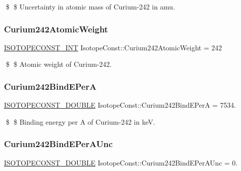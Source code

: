 \$ \$ Uncertainty in atomic mass of Curium-\/242 in amu. \mbox{\label{group___isotope_const-_curium-_cm242_gaaea41d7ce7da9f09d6c66ef2e4c37550}} 
\subsubsection{\texorpdfstring{Curium242\+Atomic\+Weight}{Curium242AtomicWeight}}
{\footnotesize\ttfamily \mbox{\hyperlink{group___isotope_const-_macros_ga5f18360b3e99483a35c32d789e62621c}{I\+S\+O\+T\+O\+P\+E\+C\+O\+N\+S\+T\+\_\+\+I\+NT}} Isotope\+Const\+::\+Curium242\+Atomic\+Weight = 242}

\$ \$ Atomic weight of Curium-\/242. \mbox{\label{group___isotope_const-_curium-_cm242_gaabe348310f75f6a88f179a2be4bc4879}} 
\subsubsection{\texorpdfstring{Curium242\+Bind\+E\+PerA}{Curium242BindEPerA}}
{\footnotesize\ttfamily \mbox{\hyperlink{group___isotope_const-_macros_ga8f45a7272ce02c0b4c65c44636ed719a}{I\+S\+O\+T\+O\+P\+E\+C\+O\+N\+S\+T\+\_\+\+D\+O\+U\+B\+LE}} Isotope\+Const\+::\+Curium242\+Bind\+E\+PerA = 7534.}

\$ \$ Binding energy per A of Curium-\/242 in keV. \mbox{\label{group___isotope_const-_curium-_cm242_gadaebc4b3d4e3f3cbd4e71d6b2f3c2c37}} 
\subsubsection{\texorpdfstring{Curium242\+Bind\+E\+Per\+A\+Unc}{Curium242BindEPerAUnc}}
{\footnotesize\ttfamily \mbox{\hyperlink{group___isotope_const-_macros_ga8f45a7272ce02c0b4c65c44636ed719a}{I\+S\+O\+T\+O\+P\+E\+C\+O\+N\+S\+T\+\_\+\+D\+O\+U\+B\+LE}} Isotope\+Const\+::\+Curium242\+Bind\+E\+Per\+A\+Unc = 0.}

